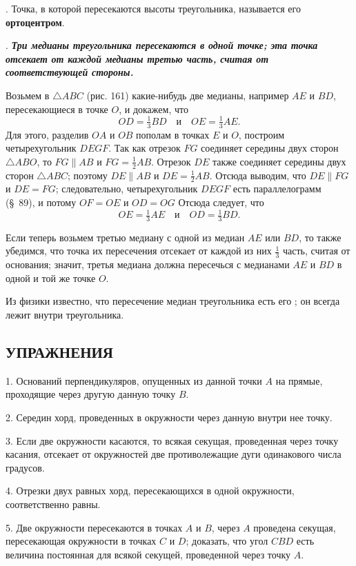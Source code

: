 \documentclass[oneside]{book}
\begin{document}
.
Точка, в которой пересекаются высоты треугольника, называется его \textbf{ортоцентром}.

.
\textbf{\emph{Три медианы треугольника пересекаются в одной точке;
эта точка отсекает от каждой медианы третью часть, считая от соответствующей стороны.}}

Возьмем в $\triangle ABC$ (рис. 161) какие-нибудь две медианы, например $AE$ и $BD$, пересекающиеся в точке $O$, и докажем, что
\[OD=\tfrac13 BD\quad\text{и}\quad OE = \tfrac13 AE.\]
Для этого, разделив $OA$ и $OB$ пополам в точках $E$ и $O$, построим четырехугольник $DEGF$.
Так как отрезок $FG$ соединяет середины двух сторон $\triangle ABO$, то $FG\parallel AB$ и $FG=\tfrac12 AB$.
Отрезок $DE$ также соединяет середины двух сторон $\triangle ABC$;
поэтому $DE\parallel AB$ и $DE=\tfrac12 AB$.
Отсюда выводим, что $DE \parallel FG$ и $DE=FG$;
следовательно, четырехугольник $DEGF$ есть параллелограмм (§~89), и потому $OF=OE$ и $OD=OG$ Отсюда следует, что
\[ OE=\tfrac13AE\quad\text{и}\quad OD=\tfrac13 BD.\]

Если теперь возьмем третью медиану с одной из медиан $AE$ или $BD$, то также убедимся, что точка их пересечения отсекает от каждой из них $\tfrac13$ часть, считая от основания;
значит, третья медиана должна пересечься с медианами $AE$ и $BD$ в одной и той же точке $O$.

Из физики известно, что пересечение медиан треугольника есть его ;
он всегда лежит внутри треугольника.


\subsection*{УПРАЖНЕНИЯ}


1.
Оснований перпендикуляров, опущенных из данной точки $A$ на прямые, проходящие через другую данную точку $B$.

2.
Середин хорд, проведенных в окружности через данную внутри нее точку.


3.
Если две окружности касаются, то всякая секущая, проведенная через точку касания, отсекает от окружностей две противолежащие дуги одинакового числа градусов.

4.
Отрезки двух равных хорд, пересекающихся в одной окружности, соответственно равны.

5.
Две окружности пересекаются в точках $A$ и $B$, через $A$ проведена секущая, пересекающая окружности в точках $C$ и $D$;
доказать, что угол $CBD$ есть величина постоянная для всякой секущей, проведенной через точку $A$.
\end{document}
